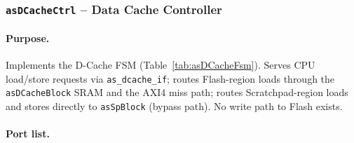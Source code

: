 \subsubsection{\texttt{asDCacheCtrl} -- Data Cache Controller}
\label{subsubsec:asDCacheCtrl}

\paragraph{Purpose.}
Implements the D-Cache FSM (Table~\ref{tab:asDCacheFsm}).
Serves CPU load/store requests via \texttt{as\_dcache\_if};
routes Flash-region loads through the \texttt{asDCacheBlock} SRAM and
the AXI4 miss path; routes Scratchpad-region loads and stores directly
to \texttt{asSpBlock} (bypass path).
No write path to Flash exists.

\paragraph{Port list.}

